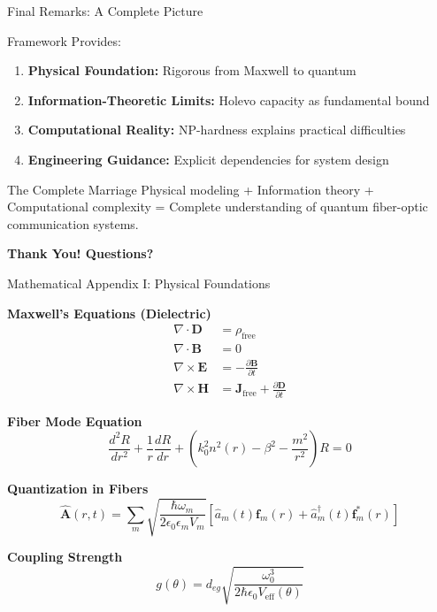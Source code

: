 \documentclass[10pt]{beamer}
\begin{document}
\begin{frame}{Final Remarks: A Complete Picture}
\begin{block}{Framework Provides:}
\begin{enumerate}
\item \textbf{Physical Foundation:} Rigorous from Maxwell to quantum
\item \textbf{Information-Theoretic Limits:} Holevo capacity as fundamental bound
\item \textbf{Computational Reality:} NP-hardness explains practical difficulties
\item \textbf{Engineering Guidance:} Explicit dependencies for system design
\end{enumerate}
\end{block}

\begin{block}{The Complete Marriage}
Physical modeling + Information theory + Computational complexity = Complete understanding of quantum fiber-optic communication systems.
\end{block}

\begin{center}
\Large \textbf{Thank You! Questions?}
\end{center}
\end{frame}

\begin{frame}{Mathematical Appendix I: Physical Foundations}
\footnotesize

\textbf{Maxwell's Equations (Dielectric)}
\begin{align*}
\nabla \cdot \mathbf{D} &= \rho_{\text{free}} \\
\nabla \cdot \mathbf{B} &= 0 \\
\nabla \times \mathbf{E} &= -\frac{\partial \mathbf{B}}{\partial t} \\
\nabla \times \mathbf{H} &= \mathbf{J}_{\text{free}} + \frac{\partial \mathbf{D}}{\partial t}
\end{align*}

\textbf{Fiber Mode Equation}
\begin{equation*}
\frac{d^2R}{dr^2} + \frac{1}{r}\frac{dR}{dr} + \left(k_0^2n^2(r) - \beta^2 - \frac{m^2}{r^2}\right)R = 0
\end{equation*}

\textbf{Quantization in Fibers}
\begin{equation*}
\hat{\mathbf{A}}(r,t) = \sum_m \sqrt{\frac{\hbar\omega_m}{2\epsilon_0 \epsilon_m V_m}}[\hat{a}_m(t) \mathbf{f}_m(r) + \hat{a}_m^\dagger(t) \mathbf{f}_m^*(r)]
\end{equation*}

\textbf{Coupling Strength}
\begin{equation*}
g(\theta) = d_{eg}\sqrt{\frac{\omega_0^3}{2\hbar\epsilon_0 V_{\text{eff}}(\theta)}}
\end{equation*}

\end{frame}
\end{document}
